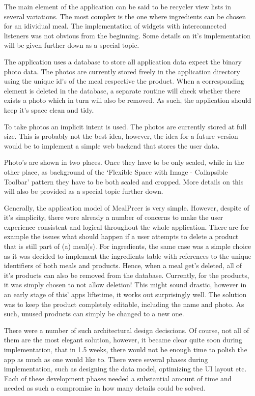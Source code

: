 \documentclass[a4paper,11pt,twoside]{article}
\begin{document}
The main element of the application can be said to be recycler view lists in
several variations. The most complex is the one where ingredients can be chosen
for an idividual meal. The implementation of widgets with interconnected listeners
was not obvious from the beginning. Some details on it's implementation will be
given further down as a special topic.

The application uses a database to store all application data expect the binary
photo data. The photos are currently stored freely in the application directory
using the unique id's of the meal respective the product. When a corresponding
element is deleted in the database, a separate routine will check whether there
exists a photo which in turn will also be removed. As such, the application
should keep it's space clean and tidy.

To take photos an implicit intent is used. The photos are currently stored at
full size. This is probably not the best idea, however, the idea for a future
version would be to implement a simple web backend that stores the user data.

Photo's are shown in two places. Once they have to be only scaled, while in the
other place, as background of the `Flexible Space with Image - Collapsible Toolbar'
pattern they have to be both scaled and cropped. More details on this will also be
provided as a special topic further down.

Generally, the application model of MealPrcer is very simple. However, despite of
it's simplicity, there were already a number of concerns to make the user
experience consistent and logical throughout the whole application. There are for
example the issues what should happen if a user attempts to delete a product that
is still part of (a) meal(s). For ingredients, the same case was a simple choice
as it was decided to implement the ingredients table with references to the
unique identifiers of both meals and products. Hence, when a meal get's deleted,
all of it's products can also be removed from the database. Currently, for the
products, it was simply chosen to not allow deletion! This might sound drastic,
however in an early stage of this' apps liftetime, it works out surprisingly
well. The solution was to keep the product completely editable, including the
name and photo. As such, unused products can simply be changed to a new one.

There were a number of such architectural design deciscions. Of course, not all
of them are the most elegant solution, however, it became clear quite soon during
implementation, that in 1.5 weeks, there would not be enough time to polish the
app as much as one would like to. There were several phases during implementation,
such as designing the data model, optimizing the UI layout etc. Each of these
development phases needed a substantial amount of time and needed as such
a compromise in how many details could be solved.
\end{document}
